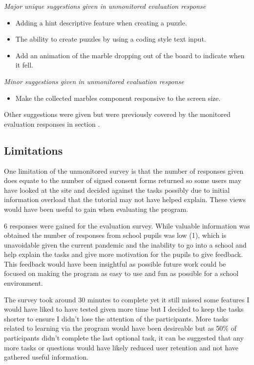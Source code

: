 \documentclass{l4proj}
\begin{document}
\emph{Major unique suggestions given in unmonitored evaluation response}
\begin{itemize}
    \item Adding a hint descriptive feature when creating a puzzle.
    \item The ability to create puzzles by using a coding style text input.
    \item Add an animation of the marble dropping out of the board to indicate when it fell.
\end{itemize}

\emph{Minor suggestions given in unmonitored evaluation response}
\begin{itemize}
    \item Make the collected marbles component responsive to the screen size.
\end{itemize}

Other suggestions were given but were previously covered by the monitored evaluation responses in section .

\subsection{Limitations}
One limitation of the unmonitored survey is that the number of responses given does equate to the number of signed consent forms returned so some users may have looked at the site and decided against the tasks possibly due to initial information overload that the tutorial may not have helped explain. These views would have been useful to gain when evaluating the program.

6 responses were gained for the evaluation survey. While valuable information was obtained the number of responses from school pupils was low (1), which is unavoidable given the current pandemic and the inability to go into a school and help explain the tasks and give more motivation for the pupils to give feedback. This feedback would have been insightful as possible future work could be focused on making the program as easy to use and fun as possible for a school environment. 

The survey took around 30 minutes to complete yet it still missed some features I would have liked to have tested given more time but I decided to keep the tasks shorter to ensure I didn't lose the attention of the participants. More tasks related to learning via the program would have been desireable but as 50\% of participants didn't complete the last optional task, it can be suggested that any more tasks or questions would have likely reduced user retention and not have gathered useful information.
\end{document}
